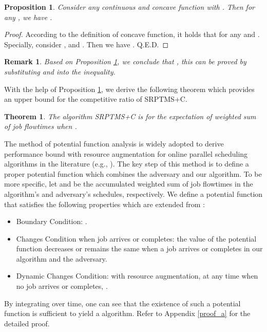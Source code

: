 \documentclass[10pt,conference,compsocconf,letterpaper]{IEEEtran}
\newtheorem{Theorem}{Theorem}
\newtheorem{prop}{Proposition}
\newtheorem{remark}{Remark}
\begin{document}
\begin{prop}
\label{convex_function}
Consider any continuous and concave function  with . Then for any , we have
 .
\end{prop}

\begin{proof}
According to the definition of concave function, it holds that  for any
 and . Specially, consider ,  and . Then we have . Q.E.D.
\end{proof}



\begin{remark}
\label{extention}
Based on Proposition \ref{convex_function}, we conclude that , this can be proved by substituting  and
 into the inequality.
\end{remark}

With the help of Proposition \ref{convex_function}, we derive the following theorem which provides an upper bound
for the competitive ratio of SRPTMS+C.

\begin{Theorem}
\label{competitive_ratio}
The algorithm SRPTMS+C is   for the expectation of weighted sum of job flowtimes
when .
\end{Theorem}
The method of potential function analysis is widely adopted to derive performance bound with resource augmentation for
online parallel scheduling algorithms in the literature (e.g., \cite{competitive,energy_efficient,scalably-scheduling,SRPT_identical}).
The key step of this method is to define a proper potential function which combines the adversary and our algorithm.
To be more specific, let  and  be the accumulated weighted sum of job flowtimes in the algorithm's and adversary's
schedules, respectively. We define a potential function  that satisfies the following properties which are extended from \cite{competitive}:

\begin{itemize}
\item Boundary Condition: .
\item Changes Condition when job arrives or completes: the value of the potential function decreases or remains the same  when a job arrives or completes
in our algorithm and the adversary.
\item Dynamic Changes Condition: with  resource augmentation,
at any time when no job arrives or completes, .
\end{itemize}

By integrating over time, one can see that the existence of such a potential function is sufficient to yield a  
algorithm. Refer to Appendix \ref{proof_a} for the detailed proof. 
\end{document}
